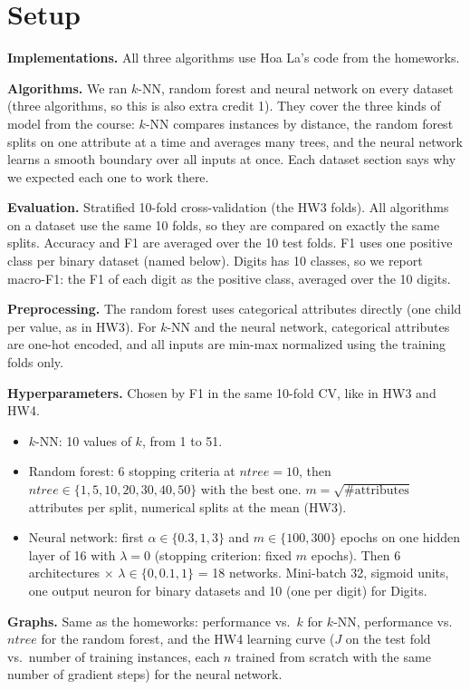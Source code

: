 \documentclass{article}
\begin{document}
\section*{Setup}

\textbf{Implementations.} All three algorithms use Hoa La's code from the homeworks.

\textbf{Algorithms.} We ran $k$-NN, random forest and neural network on every dataset
(three algorithms, so this is also extra credit 1). They cover the three kinds of model from the course:
$k$-NN compares instances by distance, the random forest splits on one attribute at a time and averages
many trees, and the neural network learns a smooth boundary over all inputs at once. Each dataset section
says why we expected each one to work there.

\textbf{Evaluation.} Stratified 10-fold cross-validation (the HW3 folds). All algorithms on a dataset use
the same 10 folds, so they are compared on exactly the same splits. Accuracy and F1 are averaged over
the 10 test folds. F1 uses one positive class per binary dataset (named below). Digits has 10 classes, so
we report macro-F1: the F1 of each digit as the positive class, averaged over the 10 digits.

\textbf{Preprocessing.} The random forest uses categorical attributes directly (one child per value,
as in HW3). For $k$-NN and the neural network, categorical attributes are one-hot encoded, and all
inputs are min-max normalized using the training folds only.

\textbf{Hyperparameters.} Chosen by F1 in the same 10-fold CV, like in HW3 and HW4.
\begin{itemize}
\item $k$-NN: 10 values of $k$, from 1 to 51.
\item Random forest: 6 stopping criteria at $ntree = 10$, then $ntree \in \{1, 5, 10, 20, 30, 40, 50\}$ with the best one.
$m = \sqrt{\#\text{attributes}}$ attributes per split, numerical splits at the mean (HW3).
\item Neural network: first $\alpha \in \{0.3, 1, 3\}$ and $m \in \{100, 300\}$ epochs on one hidden layer of
16 with $\lambda = 0$ (stopping criterion: fixed $m$ epochs). Then 6 architectures $\times$
$\lambda \in \{0, 0.1, 1\}$ = 18 networks. Mini-batch 32, sigmoid units, one output neuron for binary
datasets and 10 (one per digit) for Digits.
\end{itemize}

\textbf{Graphs.} Same as the homeworks: performance vs.\ $k$ for $k$-NN, performance vs.\ $ntree$ for the
random forest, and the HW4 learning curve ($J$ on the test fold vs.\ number of training instances, each $n$
trained from scratch with the same number of gradient steps) for the neural network.
\end{document}

